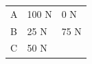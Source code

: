 \begin{enumerate}[noitemsep, label=\textbf{\arabic*}. ]
{{\begin{center}
\begin{tabular}[t]{|l|l|l|}
    
        A &
    
    
        100 N &
    
    
        0 N%
     \tabularnewline\cline{1-1}\cline{2-2}\cline{3-3}
    
    
        B &
    
    
        25 N &
    
    
        75 N%
     \tabularnewline\cline{1-1}\cline{2-2}\cline{3-3}
    
    
        C &
    
    
        50 N &
    
    

\end{tabular}
\end{center}}}
\end{enumerate}
